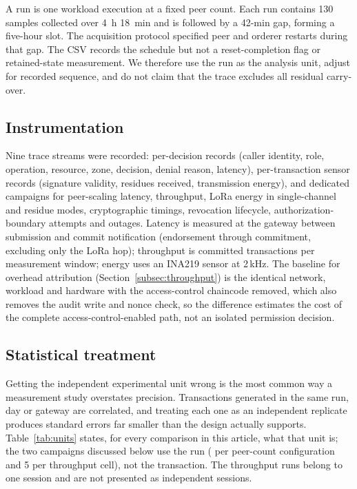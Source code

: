 \documentclass[a4paper,fleqn]{cas-dc}
\begin{document}
A run is one workload execution at a fixed peer count. Each run contains
130 samples collected over 4~h 18~min and is followed by a 42-min gap,
forming a five-hour slot. The acquisition protocol specified peer and
orderer restarts during that gap. The CSV records the schedule but not a
reset-completion flag or retained-state measurement. We therefore use the
run as the analysis unit, adjust for recorded sequence, and do not claim
that the trace excludes all residual carry-over.

\subsection{Instrumentation}
\label{subsec:instrumentation}

Nine trace streams were recorded: per-decision records (caller identity,
role, operation, resource, zone, decision, denial reason, latency),
per-transaction sensor records (signature validity, residues received,
transmission energy), and dedicated campaigns for peer-scaling latency,
throughput, LoRa energy in single-channel and residue modes,
cryptographic timings, revocation lifecycle, authorization-boundary
attempts and outages. Latency is measured at the gateway between
submission and commit notification (endorsement through commitment,
excluding only the LoRa hop); throughput is committed transactions per
measurement window; energy uses an INA219 sensor at 2\,kHz. The baseline
for overhead attribution (Section~\ref{subsec:throughput}) is the
identical network, workload and hardware with the access-control
chaincode removed, which also removes the audit write and nonce check, so
the difference estimates the cost of the complete access-control-enabled
path, not an isolated permission decision.

\subsection{Statistical treatment}
\label{subsec:stats}

Getting the independent experimental unit wrong is the most common way a
measurement study overstates precision. Transactions generated in the same
run, day or gateway are correlated, and treating each one as an independent
replicate produces standard errors far smaller than the design actually
supports. Table~\ref{tab:units} states, for every comparison in this
article, what that unit is; the two campaigns discussed below use the run
(\PartRunsPerConfig{} per peer-count configuration and 5 per throughput
cell), not the transaction. The throughput runs belong to one session and
are not presented as independent sessions.
\end{document}
